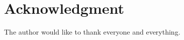 \documentclass[journal,comsoc,twoside]{IEEEtran}
\begin{document}

%






\section*{Acknowledgment}


The author would like to thank everyone and everything.


\ifCLASSOPTIONcaptionsoff
  \newpage
\fi




\end{document}
